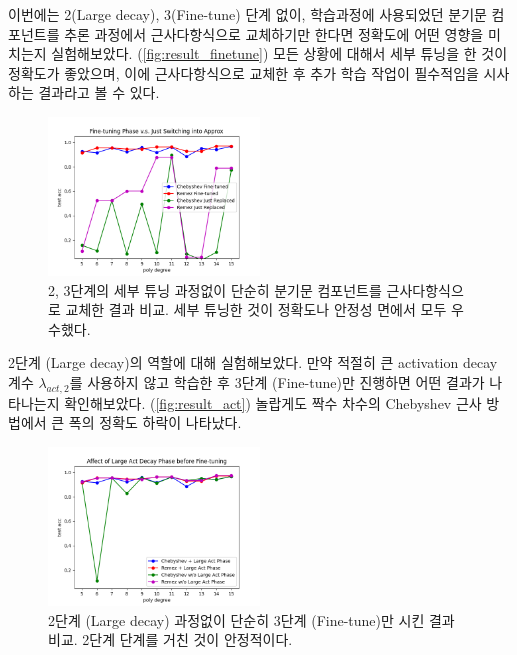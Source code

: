 \documentclass[a4paper, 11pt, chapterprefix=false]{report}
\begin{document}
이번에는 2(Large decay), 3(Fine-tune) 단계 없이, 학습과정에 사용되었던 분기문
컴포넌트를 추론 과정에서 근사다항식으로 교체하기만 한다면 정확도에 어떤 영향을
미치는지 실험해보았다. (\autoref{fig:result_finetune}) 모든 상황에 대해서 세부
튜닝을 한 것이 정확도가 좋았으며, 이에 근사다항식으로 교체한 후 추가 학습 작업이
필수적임을 시사하는 결과라고 볼 수 있다.
\begin{figure}[htbp]
  \centering
  \includegraphics[width=0.5\textwidth]{resource/finetune.png}
  \caption{2, 3단계의 세부 튜닝 과정없이 단순히 분기문 컴포넌트를 근사다항식으로 교체한 결과 비교. 세부 튜닝한 것이 정확도나 안정성 면에서 모두 우수했다.}
  \label{fig:result_finetune}
\end{figure}

2단계 (Large decay)의 역할에 대해 실험해보았다. 만약 적절히 큰 activation decay
계수 $\lambda_{act, 2}$를 사용하지 않고 학습한 후 3단계 (Fine-tune)만 진행하면
어떤 결과가 나타나는지 확인해보았다. (\autoref{fig:result_act}) 놀랍게도 짝수
차수의 Chebyshev 근사 방법에서 큰 폭의 정확도 하락이 나타났다.
\begin{figure}[htbp]
  \centering
  \includegraphics[width=0.5\textwidth]{resource/act.png}
  \caption{2단계 (Large decay) 과정없이 단순히 3단계 (Fine-tune)만 시킨 결과 비교. 2단계 단계를 거친 것이 안정적이다.}
  \label{fig:result_act}
\end{figure}
\end{document}
